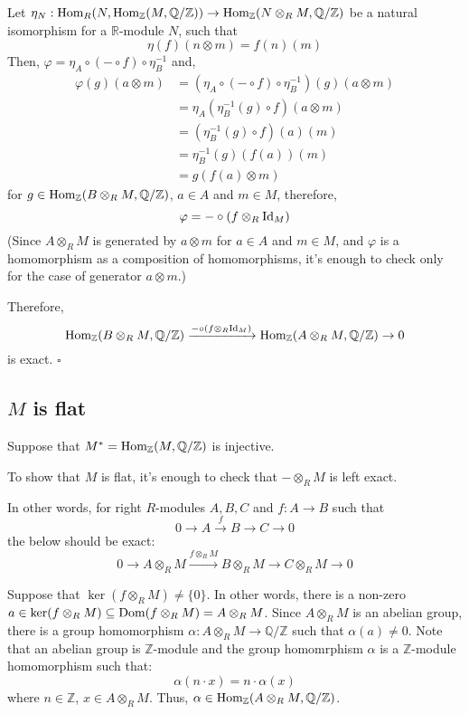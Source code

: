 \documentclass{article}
\newcommand{\qedsq}{\hfill$\square$}
\newcommand{\bbQ}{\mathbb{Q}}
\newcommand{\bbR}{\mathbb{R}}
\newcommand{\bbZ}{\mathbb{Z}}
\newcommand{\Dom}{\textnormal{Dom}}
\newcommand{\Hom}{\textnormal{Hom}}
\newcommand{\Id}{\textnormal{Id}}
\begin{document}
Let \(\eta_N: \Hom_R(N, \Hom_\bbZ(M, \bbQ/\bbZ)) \to \Hom_\bbZ(N \otimes_R M, \bbQ/\bbZ)\) be a natural isomorphism for a \(\bbR\)-module \(N\), such that
\[\eta(f)(n \otimes m) = f(n)(m)\]
Then, \(\varphi = \eta_A \circ (- \circ f) \circ \eta_B^{-1}\) and,
\begin{align*}
  \varphi(g)(a \otimes m)
  &= (\eta_A \circ (- \circ f) \circ \eta_B^{-1})(g)(a \otimes m)
  \\&= \eta_A(\eta_B^{-1}(g) \circ f)(a \otimes m)
  \\&= (\eta_B^{-1}(g) \circ f)(a)(m)
  \\&= \eta_B^{-1}(g)(f(a))(m)
  \\&= g(f(a) \otimes m)
\end{align*}
for \(g \in \Hom_\bbZ(B \otimes_R M, \bbQ/\bbZ)\), \(a \in A\) and \(m \in M\),  therefore,
\[\varphi = - \circ (f \otimes_R \Id_M)\]
(Since \(A \otimes_R M\) is generated by \(a \otimes m\) for \(a \in A\) and \(m \in M\), and \(\varphi\) is a homomorphism as a composition of homomorphisms, it's enough to check only for the case of generator \(a \otimes m\).)

Therefore,
\[
  \Hom_\bbZ(B \otimes_R M, \bbQ/\bbZ)
  \xrightarrow{- \circ (f \otimes_R \Id_M)}
  \Hom_\bbZ(A \otimes_R M, \bbQ/\bbZ)
  \rightarrow
  0
\]
is exact.
\qedsq

\subsection*{\(M\) is flat}

Suppose that \(M^* = \Hom_\bbZ(M, \bbQ/\bbZ)\) is injective.

To show that \(M\) is flat, it's enough to check that \(- \otimes_R M\) is left exact.

In other words, for right \(R\)-modules \(A, B, C\) and \(f: A \to B\)  such that
\[
  0
  \rightarrow
  A
  \xrightarrow{f}
  B
  \rightarrow
  C
  \rightarrow
  0
\]
the below should be exact:
\[
  0
  \rightarrow
  A \otimes_R M
  \xrightarrow{f \otimes_R M}
  B \otimes_R M
  \rightarrow
  C \otimes_R M
  \rightarrow
  0
\]

Suppose that \(\ker (f \otimes_R M) \neq \{0\}\).
In other words, there is a non-zero
\(a \in \ker (f \otimes_R M) \subseteq \Dom (f \otimes_R M) = A \otimes_R M\).
Since \(A \otimes_R M\) is an abelian group,
there is a group homomorphism \(\alpha: A \otimes_R M \to \bbQ / \bbZ\)
such that \(\alpha(a) \neq 0\).
Note that an abelian group is \(\bbZ\)-module and the group homomrphism \(\alpha\) is a \(\bbZ\)-module homomorphism such that:
\[\alpha(n \cdot x) = n \cdot \alpha(x)\]
where \(n \in \bbZ\), \(x \in A \otimes_R M\).
Thus, \(\alpha \in \Hom_\bbZ(A \otimes_R M, \bbQ / \bbZ)\).
\end{document}
